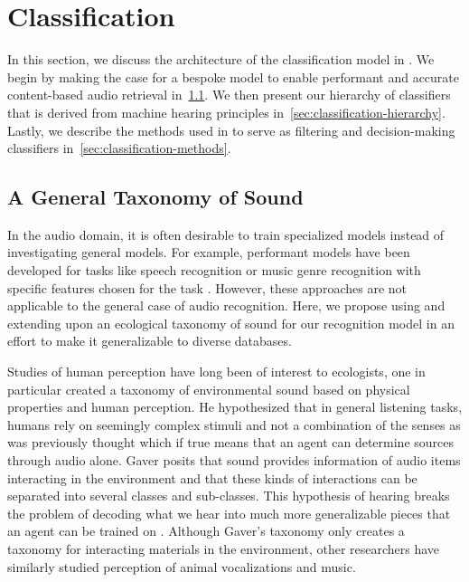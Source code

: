 \section{Classification}

In this section, we discuss the architecture of the classification model in
\sys. We begin by making the case for a bespoke model to enable performant and
accurate content-based audio retrieval in~\cref{sec:classification-case}.
We then present our hierarchy of classifiers that is derived from 
machine hearing principles in~\cref{sec:classification-hierarchy}.
Lastly, we describe the methods used in \sys to serve as filtering and
decision-making classifiers in~\cref{sec:classification-methods}.

\subsection{A General Taxonomy of Sound}
\label{sec:classification-case}

In the audio domain, it is often desirable to train specialized models instead
of investigating general models. For example, performant models have been
developed for tasks like speech recognition or music genre recognition with
specific features chosen for the task \cite{Campbell1997,
tzanetakis-musical-2002}. However, these approaches are not applicable to the
general case of audio recognition. Here, we propose using and extending upon an
ecological taxonomy of sound for our recognition model in an effort to make it
generalizable to diverse databases.

Studies of human perception have long been of interest to ecologists, one in
particular created a taxonomy of environmental sound based on physical
properties and human perception. He hypothesized that in general listening
tasks, humans rely on seemingly complex stimuli and not a combination of the
senses as was previously thought which if true means that an agent can determine
sources through audio alone. Gaver posits that sound provides information of
audio items interacting in the environment and that these kinds of interactions
can be separated into several classes and sub-classes. This hypothesis of
hearing breaks the problem of decoding what we hear into much more generalizable
pieces that an agent can be trained on \cite{Gaver1993}. Although Gaver's
taxonomy only creates a taxonomy for interacting materials in the environment,
other researchers have similarly studied perception of animal vocalizations and
music.

